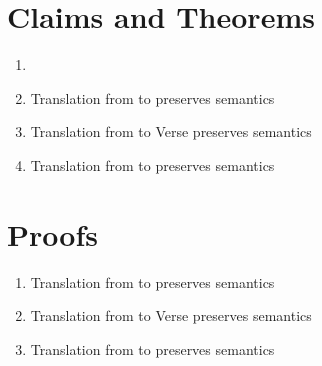 \documentclass[]{article}
\begin{document}
\section{Claims and Theorems}

\begin{enumerate}
    \item 
    \item Translation from {\VMinus} to {\D} preserves semantics 
    \item Translation from {\VMinus} to Verse preserves semantics
    \item Translation from {\PPlus} to {\VMinus} preserves semantics 
\end{enumerate}

\section{Proofs}
\begin{enumerate}
    \item Translation from {\VMinus} to {\D} preserves semantics 
    \item Translation from {\VMinus} to Verse preserves semantics
    \item Translation from {\PPlus} to {\VMinus} preserves semantics 
\end{enumerate}
\end{document}
